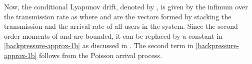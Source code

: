 Now, the conditional Lyapunov drift, denoted by , is given by the infimum over the transmission rate as
\iftoggle{single_column}{ \allowdisplaybreaks
\begin{IEEEeqnarray}{rCl} \label{backpressure-approx} \neqsub
	\underset{\mbf{t}}{\text{inf}} &\quad& \Delta(\mbf{Q}(i)) \triangleq \mathbb{E}_{\mbfa{\lambda},\mbf{t}} \set{\mathrm{L}\sset{\mbf{Q}(i+1)} - \mathrm{L}\sset{\mbf{Q}(i)} \vert \mbf{Q}(i)} \IEEEyessubnumber \\
	&\leq& \underbrace{\mathbb{E}_{\mbfa{\lambda},\mbf{t}} \set {\sum_{k \in \mc{U}} \, \frac{\lambda^2_k(i) + t_k^2(i)}{2} \vert \mbf{Q}(i)}}_{\le B} + \sum_{k \in \mc{U}} Q_k(i) A_k(i) - \mathbb{E}_{\mbfa{\lambda},\mbf{t}}\set{\sum_{k \in \mc{U}} Q_k(i) t_k(i)  \vert \mbf{Q}(i)}, \eqsub \label{backpressure-approx-1b}
\end{IEEEeqnarray}}{ \allowdisplaybreaks
\begin{IEEEeqnarray}{CL} \label{backpressure-approx} \neqsub
	\underset{\mbf{t}}{\text{inf}} \quad & \mathbb{E}_{\mbfa{\lambda},\mbf{t}} \set{\mathrm{L}\sset{\mbf{Q}(i+1)} - \mathrm{L}\sset{\mbf{Q}(i)} \vert \mbf{Q}(i)} \eqsub \\
	\leq & \underbrace{\mathbb{E}_{\mbfa{\lambda},\mbf{t}} \Big \lbrace \sum_{k \in \mc{U}} \frac{\lambda^2_k(i) + t_k^2(i)}{2} \vert \mbf{Q}(i) \Big \rbrace }_{\le B} + \sum_{k \in \mc{U}} Q_k(i) A_k(i) \nonumber \\
	& \qquad \qquad {} - \mathbb{E}_{\mbfa{\lambda},\mbf{t}}\Big \lbrace \sum_{k \in \mc{U}} Q_k(i) t_k(i)  \vert \mbf{Q}(i) \Big \rbrace, \eqsub \label{backpressure-approx-1b}
\end{IEEEeqnarray}}
where  and \me{\mbfa{\lambda}} are the vectors formed by stacking the transmission and the arrival rate of all users in the system. Since the second order moments of  and \me{\mbfa{\lambda}} are bounded, it can be replaced by a constant  in \eqref{backpressure-approx-1b} as discussed in \cite{neely2010stochastic}. The second term in \eqref{backpressure-approx-1b} follows from the Poisson arrival process.


